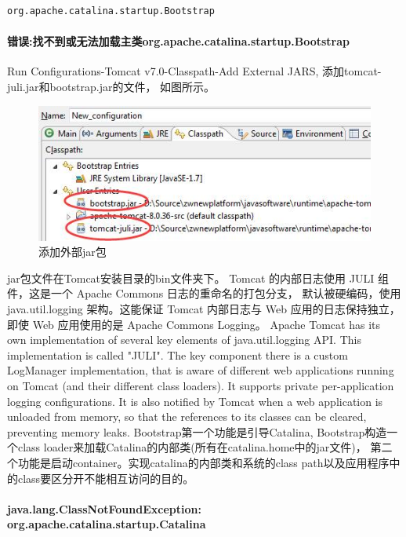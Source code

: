 \documentclass{book}
\begin{document}
\begin{lstlisting}[language=Bash]
org.apache.catalina.startup.Bootstrap
\end{lstlisting}

\paragraph{错误:找不到或无法加载主类org.apache.catalina.startup.Bootstrap}

Run Configurations-Tomcat v7.0-Classpath-Add External JARS,
添加tomcat-juli.jar和bootstrap.jar的文件，
如图所示。

\begin{figure}[htbp]
	\centering
	\includegraphics[scale=0.5]{DebugTomcatAddMissingJar.jpg}
	\caption{添加外部jar包}
	\label{code:DebugTomcatAddMissingJar}
\end{figure}

jar包文件在Tomcat安装目录的bin文件夹下。
Tomcat 的内部日志使用 JULI 组件，这是一个 Apache Commons 日志的重命名的打包分支，
默认被硬编码，使用 java.util.logging 架构。这能保证 Tomcat 内部日志与 Web 应用的日志保持独立，
即使 Web 应用使用的是 Apache Commons Logging。
Apache Tomcat has its own implementation of several key elements of java.util.logging API. 
This implementation is called "JULI". The key component there is a custom LogManager implementation, 
that is aware of different web applications running on Tomcat (and their different class loaders). 
It supports private per-application logging configurations. 
It is also notified by Tomcat when a web application is unloaded from memory, 
so that the references to its classes can be cleared, preventing memory leaks.
Bootstrap第一个功能是引导Catalina,
Bootstrap构造一个class loader来加载Catalina的内部类(所有在catalina.home中的jar文件)，
第二个功能是启动container。实现catalina的内部类和系统的class path以及应用程序中的class要区分开不能相互访问的目的。　

\paragraph{java.lang.ClassNotFoundException: org.apache.catalina.startup.Catalina}
\end{document}
